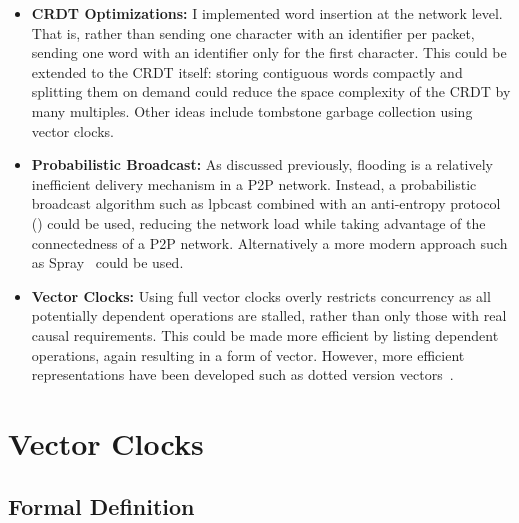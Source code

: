 \documentclass[12pt,a4paper,twoside,openright]{report}
\begin{document}
\begin{itemize}
	\item{\textbf{CRDT Optimizations: } I implemented word insertion at the network level. That is, rather than sending one character with an identifier per packet, sending one word with an identifier only for the first character. This could be extended to the CRDT itself: storing contiguous words compactly and splitting them on demand could reduce the space complexity of the CRDT by many multiples. Other ideas include tombstone garbage collection using vector clocks.}
	
	\item{\textbf{Probabilistic Broadcast: } As discussed previously, flooding is a relatively inefficient delivery mechanism in a P2P network. Instead, a probabilistic broadcast algorithm such as lpbcast combined with an anti-entropy protocol (\cite{eugster2003lightweight}) could be used, reducing the network load while taking advantage of the connectedness of a P2P network. Alternatively a more modern approach such as Spray~\cite{nedelec2015spray} could be used.}

	\item{\textbf{Vector Clocks: } Using full vector clocks overly restricts concurrency as all potentially dependent operations are stalled, rather than only those with real causal requirements. This could be made more efficient by listing dependent operations, again resulting in a form of vector. However, more efficient representations have been developed such as dotted version vectors~\cite{preguicca2010dotted}.}

\end{itemize}



\printbibliography

\appendix

\chapter{Vector Clocks}

\section{Formal Definition}
\label{appendix:vectorclocks}
\end{document}
